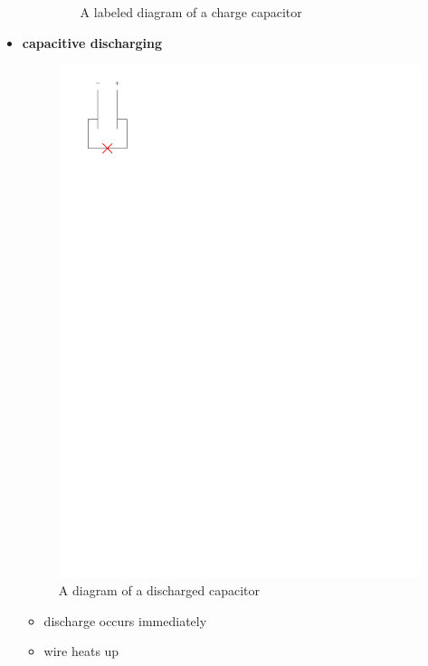 \documentclass{article}
\begin{document}
\begin{itemize}
\begin{itemize}
\begin{figure}[H]
              \caption{A labeled diagram of a charge capacitor}
            \end{figure}
        \end{itemize}
      \item \textbf{capacitive discharging}
        \begin{figure}[H]
          \centering
          \includegraphics{figures/discharged-capacitor.pdf}
          \caption{A diagram of a discharged capacitor}
        \end{figure}
        \begin{itemize}
          \item discharge occurs immediately
          \item wire heats up
        \end{itemize} 
        \begin{figure}[H]
          \centering

\end{figure}
\end{itemize}
\end{document}

